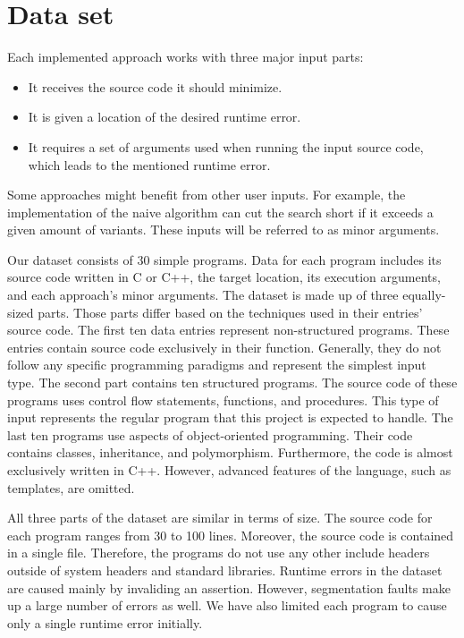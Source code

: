 \section{Data set}

Each implemented approach works with three major input parts:
\begin{itemize}
  \item It receives the source code it should minimize.
  \item It is given a location of the desired runtime error.
  \item It requires a set of arguments used when running the input source 
  code, which leads to the mentioned runtime error.
\end{itemize}
Some approaches might benefit from other user inputs. 
For example, the implementation of the naive algorithm can cut the search 
short if it exceeds a given amount of variants. 
These inputs will be referred to as minor arguments.

Our dataset consists of 30 simple programs. 
Data for each program includes its source code written in C or C++, 
the target location, its execution arguments, and each approach's minor 
arguments. 
The dataset is made up of three equally-sized parts. 
Those parts differ based on the techniques used in their entries' source code. 
The first ten data entries represent non-structured programs. 
These entries contain source code exclusively in their  function. 
Generally, they do not follow any specific programming paradigms and 
represent the simplest input type. 
The second part contains ten structured programs. 
The source code of these programs uses control flow statements, functions, 
and procedures. 
This type of input represents the regular program that this project is 
expected to handle. 
The last ten programs use aspects of object-oriented programming. 
Their code contains classes, inheritance, and polymorphism. 
Furthermore, the code is almost exclusively written in C++. 
However, advanced features of the language, such as templates, are omitted.

All three parts of the dataset are similar in terms of size. 
The source code for each program ranges from 30 to 100 lines. 
Moreover, the source code is contained in a single file. 
Therefore, the programs do not use any other include headers outside of 
system headers and standard libraries. 
Runtime errors in the dataset are caused mainly by invaliding an assertion. 
However, segmentation faults make up a large number of errors as well. 
We have also limited each program to cause only a single runtime error 
initially.

